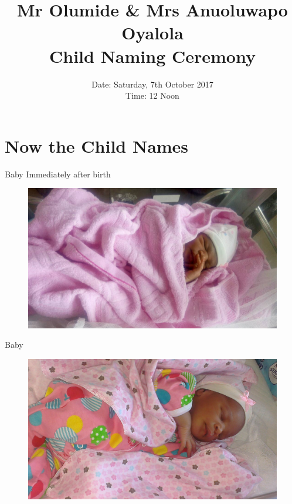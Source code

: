 \documentclass[11pt,pdf]{beamer}
\begin{document}
	\title{Mr Olumide \& Mrs Anuoluwapo Oyalola \\ Child Naming Ceremony}
	\date{\small{Date: Saturday, 7th October 2017 \\ Time: 12 Noon}}
	\begin{frame}
	\transblindsvertical
	\titlepage
\end{frame}
\section{Now the Child Names}

\begin{frame}{Baby}
\textcolor{blue!45!black}{\Large{Immediately after birth}}
\begin{figure}[t]
	\centering
	\includegraphics[width=1.01\linewidth]{Images/Morireoluwa1.jpeg}
\end{figure}
\end{frame}


\begin{frame}{Baby}
\begin{figure}[t]
	\centering
	\includegraphics[width=1.01\linewidth]{Images/baby.jpg}
\end{figure}
\end{frame}
\end{document}
